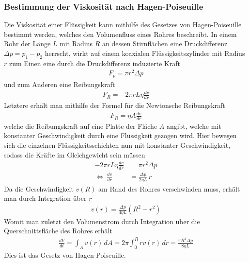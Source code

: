 \documentclass[12pt,a4paper,german]{scrartcl}
\numberwithin{equation}{section}
\begin{document}
  \subsubsection{Bestimmung der Viskosität nach Hagen-Poiseuille}
  Die Viskosität einer Flüssigkeit kann mithilfe des Gesetzes von Hagen-Poiseuille bestimmt werden, welches den Volumenfluss eines Rohres beschreibt.
  In einem Rohr der Länge $L$ mit Radius $R$ an dessen Stirnflächen eine Druckdifferenz $\Delta p = p_1 - p_2$ herrscht, wirkt auf einem koaxialen Flüssigkeitszylinder mit Radius $r$ zum Einen eine durch die Druckdifferenz induzierte Kraft
  \begin{align}
    F_p = \pi r^2 \Delta p
    \label{eq_theo_hp_force_pressure_diff}
  \end{align}
  und zum Anderen eine Reibungskraft
  \begin{align}
    F_R = -2 \pi r L \eta \frac{d v}{d r}
    \label{eq_theo_hp_force_friction}
  \end{align}
  Letztere erhält man mithilfe der Formel für die Newtonsche Reibungskraft
  \begin{align}
    F_R = \eta A \frac{d v}{d r}
    \label{eq_theo_hp_friction_newton}
  \end{align}
  welche die Reibungskraft auf eine Platte der Fläche $A$ angibt, welche mit konstanter Geschwindigkeit durch eine Flüssigkeit gezogen wird.
  Hier bewegen sich die einzelnen Flüssigkeitsschichten nun mit konstanter Geschwindigkeit, sodass die Kräfte im Gleichgewicht sein müssen
  \begin{align}
    -2 \pi r L \eta \frac{d v}{d r} &= \pi r^2 \Delta p \nonumber \\
    \Leftrightarrow \ \frac{d v}{d r} &= \frac{\Delta p}{2 \eta L} \, r
    \label{eq_theo_hp_force_equilibrium}
  \end{align}
  Da die Geschwindigkeit $v(R)$ am Rand des Rohres verschwinden muss, erhält man durch Integration über $r$
  \begin{align}
    v(r) = \frac{\Delta p}{4 \eta L} (R^2 - r^2)
    \label{eq_theo_hp_velocity}
  \end{align}
  Womit man zuletzt den Volumenstrom durch Integration über die Querschnittsfläche des Rohres erhält
  \begin{align}
    \frac{d V}{d t} = \int_A v(r) \, d A = 2 \pi \int_0^R r v(r) \, dr
    = \frac{\pi R^4 \Delta p}{8 \eta L}
    \label{eq_theo_hp_hagen_poiseuille}
  \end{align}
  Dies ist das Gesetz von Hagen-Poiseuille.
\end{document}
